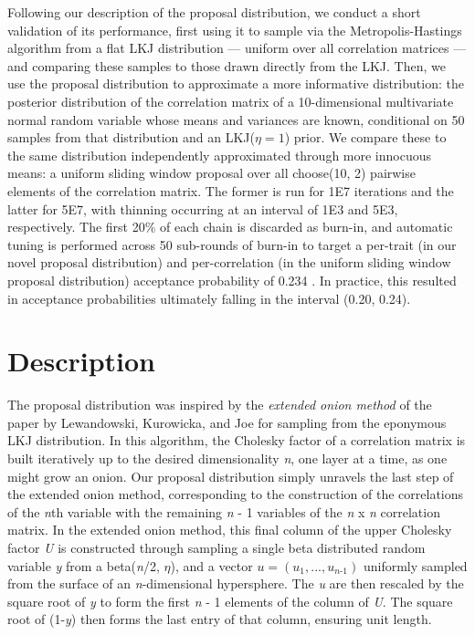\documentclass[10pt]{article}
\begin{document}
Following our description of the proposal distribution, we conduct a short validation of its performance, first using it to sample via the Metropolis-Hastings algorithm from a flat LKJ distribution --- uniform over all correlation matrices --- and comparing these samples to those drawn directly from the LKJ. Then, we use the proposal distribution to approximate a more informative distribution: the posterior distribution of the correlation matrix of a 10-dimensional multivariate normal random variable whose means and variances are known, conditional on 50 samples from that distribution and an LKJ($\eta = 1$) prior. We compare these to the same distribution independently approximated through more innocuous means: a uniform sliding window proposal over all choose(10, 2) pairwise elements of the correlation matrix. The former is run for 1E7 iterations and the latter for 5E7, with thinning occurring at an interval of 1E3 and 5E3, respectively. The first 20\% of each chain is discarded as burn-in, and automatic tuning is performed across 50 sub-rounds of burn-in to target a per-trait (in our novel proposal distribution) and per-correlation (in the uniform sliding window proposal distribution) acceptance probability of 0.234 \citep{robertsWeakConvergenceOptimal1997}. In practice, this resulted in acceptance probabilities ultimately falling in the interval (0.20, 0.24).

\clearpage

\section{Description}

The proposal distribution was inspired by the \textit{extended onion method} of the \citeyear{lewandowskiGeneratingRandomCorrelation2009} paper by Lewandowski, Kurowicka, and Joe for sampling from the eponymous LKJ distribution. In this algorithm, the Cholesky factor of a correlation matrix is built iteratively up to the desired dimensionality \textit{n}, one layer at a time, as one might grow an onion. Our proposal distribution simply unravels the last step of the extended onion method, corresponding to the construction of the correlations of the \textit{n}th variable with the remaining \textit{n} - 1 variables of the \textit{n} x \textit{n} correlation matrix. In the extended onion method, this final column of the upper Cholesky factor \textit{U} is constructed through sampling a single beta distributed random variable \textit{y} from a beta(\textit{n}/2, $\eta$), and a vector $u=(\textit{u}_{1},...,\textit{u}_{\textit{n-1}})$ uniformly sampled from the surface of an \textit{n}-dimensional hypersphere. The \textit{u} are then rescaled by the square root of \textit{y} to form the first \textit{n} - 1 elements of the column of \textit{U}. The square root of (1-\textit{y}) then forms the last entry of that column, ensuring unit length. 
\end{document}
